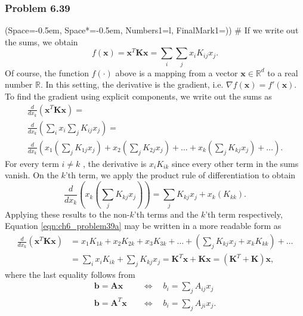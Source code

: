 \documentclass[12pt, a4paper]{article}
\newcommand{\listSpace}{-0.5em}%
\newcommand{\R}{\mathbb{R}}
\newcommand{\vect}[1]{\bm{#1}}
\begin{document}
{\subsubsection*{Problem 6.39}
\begin{easylist}[enumerate]
	\ListProperties(Space=\listSpace, Space*=\listSpace, Numbers1=l, FinalMark1={)})
	# If we write out the sums, we obtain
	\begin{equation*}
		f(\vect{x}) = \vect{x}^T \vect{K} \vect{x} = \sum_i \sum_j x_i K_{ij} x_j.
	\end{equation*}
	Of course, the function $f(\cdot)$ above is a mapping from a vector $\vect{x} \in \R^d$ to a real number $\R$.
	In this setting, the derivative is the gradient, i.e. $\nabla f(\vect{x}) = f'(\vect{x})$.
	To find the gradient using explicit components, we write out the sums as
	\begin{gather}
		\nonumber \frac{d}{d x_k} \left( \vect{x}^T \vect{K} \vect{x} \right)  = \\ 
		\nonumber \frac{d}{d x_k} \left( \sum_i x_i \sum_j K_{ij} x_j \right)  = \\
		\label{eqn:ch6_problem39a} \frac{d}{d x_k} \left( 
		x_1 \left( \sum_j K_{1j} x_j \right) + 
		x_2 \left( \sum_j K_{2j} x_j \right) + \dots +
		x_k \left( \sum_j K_{kj} x_j \right) + \dots
		 \right).
	\end{gather}
	For every term $i \neq k$ , the derivative is $x_i K_{ik}$ since every other term in the sums vanish.
	On the $k$'th term, we apply the product rule of differentiation to obtain
	\begin{equation*}
		\frac{d}{d x_k} \left( x_k \left( \sum_j K_{kj} x_j \right) \right)=
		\sum_j K_{kj} x_j  +
		x_k \left( K_{kk} \right).
	\end{equation*}
	Applying these results to the non-$k$'th terms and the $k$'th term respectively, Equation \eqref{eqn:ch6_problem39a} may be written in a more readable form as
	\begin{align*}
	\frac{d}{d x_k} \left( \vect{x}^T \vect{K} \vect{x} \right)  &=  x_1 K_{1k} + x_2 K_{2k} + x_3 K_{3k} + \dots + 
		\left(  \sum_j K_{kj} x_j  +
		x_k  K_{kk}  \right)
		+ \dots  \\
		& =  \sum_i x_i K_{ik} + \sum_j K_{kj} x_j = 
		\vect{K}^T \vect{x} + \vect{K} \vect{x} = 
		\left( \vect{K}^T + \vect{K}  \right)\vect{x},
	\end{align*}
	where the last equality follows from
	\begin{align*}
		\vect{b} = \vect{A} \vect{x} \quad &\Leftrightarrow \quad
		b_i = \sum_j A_{ij} x_j \\
		\vect{b} = \vect{A}^T \vect{x} \quad &\Leftrightarrow \quad
		b_i = \sum_j A_{ji} x_j.
	\end{align*}
	

\end{easylist}}
\end{document}
